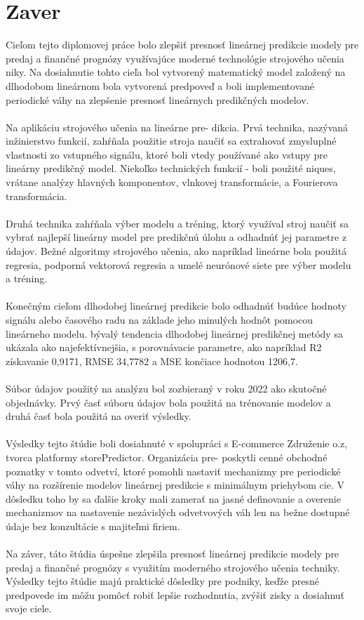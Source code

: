     \section{Zaver}
    Cieľom tejto diplomovej práce bolo zlepšiť presnosť lineárnej predikcie
    modely pre predaj a finančné prognózy využívajúce moderné technológie strojového učenia
    niky. Na dosiahnutie tohto cieľa bol vytvorený matematický model založený na dlhodobom lineárnom
    bola vytvorená predpoveď a boli implementované periodické váhy na zlepšenie
    presnosť lineárnych predikčných modelov.\\
    \\
    Na aplikáciu strojového učenia na lineárne pre-
    dikcia. Prvá technika, nazývaná inžinierstvo funkcií, zahŕňala použitie stroja
    naučiť sa extrahovať zmysluplné vlastnosti zo vstupného signálu, ktoré boli vtedy
    používané ako vstupy pre lineárny predikčný model. Niekoľko technických funkcií -
    boli použité niques, vrátane analýzy hlavných komponentov, vlnkovej transformácie,
    a Fourierova transformácia.\\
    \\
    Druhá technika zahŕňala výber modelu a tréning, ktorý využíval stroj
    naučiť sa vybrať najlepší lineárny model pre predikčnú úlohu a odhadnúť jej
    parametre z údajov. Bežné algoritmy strojového učenia, ako napríklad lineárne
    bola použitá regresia, podporná vektorová regresia a umelé neurónové siete
    pre výber modelu a tréning.\\
    \\
    Konečným cieľom dlhodobej lineárnej predikcie bolo odhadnúť budúce hodnoty
    signálu alebo časového radu na základe jeho minulých hodnôt pomocou lineárneho modelu. bývalý
    tendencia dlhodobej lineárnej predikčnej metódy sa ukázala ako najefektívnejšia, s
    porovnávacie parametre, ako napríklad R2 získavanie 0,9171, RMSE 34,7782 a MSE
    končiace hodnotou 1206,7.\\
    \\
    Súbor údajov použitý na analýzu bol zozbieraný v roku 2022 ako skutočné objednávky. Prvý
    časť súboru údajov bola použitá na trénovanie modelov a druhá časť bola použitá na
    overiť výsledky.\\
    \\
    Výsledky tejto štúdie boli dosiahnuté v spolupráci s E-commerce
    Združenie o.z, tvorca platformy storePredictor. Organizácia pre-
    poskytli cenné obchodné poznatky v tomto odvetví, ktoré pomohli nastaviť mechanizmy
    pre periodické váhy na rozšírenie modelov lineárnej predikcie s minimálnym priehybom
    cie. V dôsledku toho by sa ďalšie kroky mali zamerať na jasné definovanie a overenie
    mechanizmov na nastavenie nezávislých odvetvových váh len na bežne dostupné údaje
    bez konzultácie s majiteľmi firiem.\\
    \\
    Na záver, táto štúdia úspešne zlepšila presnosť lineárnej predikcie
    modely pre predaj a finančné prognózy s využitím moderného strojového učenia
    techniky. Výsledky tejto štúdie majú praktické dôsledky pre podniky,
    keďže presné predpovede im môžu pomôcť robiť lepšie rozhodnutia, zvýšiť zisky a
    dosiahnuť svoje ciele.